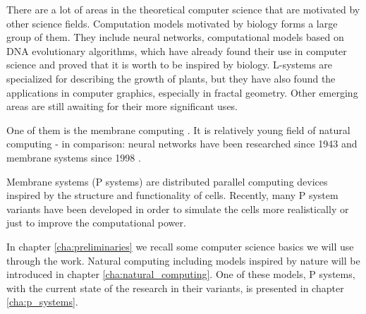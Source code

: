 
There are a lot of areas in the theoretical computer science that are motivated by other science fields. Computation models motivated by biology forms a large group of them. They include neural networks, computational models based on DNA evolutionary algorithms, which have already found their use in computer science and proved that it is worth to be inspired by biology. L-systems are specialized for describing the growth of plants, but they have also found the applications in computer graphics, especially in fractal geometry. Other emerging areas are still awaiting for their more significant uses.

One of them is the membrane computing \cite{Paun10OxfordHandbookMembraneComputing}. It is relatively young field of natural computing - in comparison: neural networks have been researched since 1943 and membrane systems since 1998 \cite{Paun98}.

Membrane systems (P systems) are distributed parallel computing devices inspired by the structure and functionality of cells. Recently, many P system variants have been developed in order to simulate the cells more realistically or just to improve the computational power.

In chapter \ref{cha:preliminaries} we recall some computer science basics we will use through the work.
Natural computing including models inspired by nature will be introduced in chapter \ref{cha:natural_computing}. One of these models, P systems, with the current state of the research in their variants, is presented in chapter \ref{cha:p_systems}.
